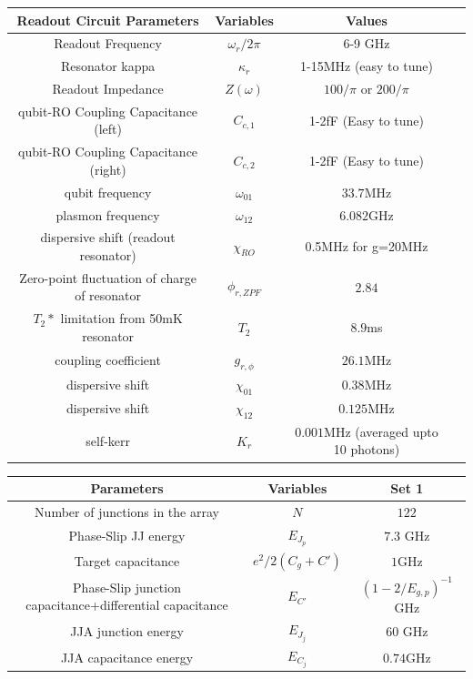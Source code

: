 \documentclass[prx,showpacs,notitlepage,twocolumn,superscriptaddress,nofootinbib,preprintnumbers,floatfix]{revtex4-2}
\begin{document}
\begin{table}[htb]
\begin{center}
\begin{tabular}{|c |c| c |c| }
 \hline
 \textbf{Readout Circuit Parameters} & \textbf{Variables} & \textbf{Values}\\ 
\hline
Readout Frequency&$\omega_r/2\pi$ &6-9 GHz\\
 \hline
 Resonator kappa&$\kappa_r$ &1-15MHz (easy to tune)\\
 \hline
Readout Impedance & $Z(\omega)$ & $100/\pi$ or $200/\pi$\\
 \hline
 qubit-RO Coupling Capacitance (left) &$C_{c,1}$ &1-2fF (Easy to tune)\\
 \hline
 qubit-RO Coupling Capacitance (right) &$C_{c,2}$ &1-2fF (Easy to tune)\\
 \hline
qubit frequency &$\omega_{01}$&$33.7$MHz\\ 
 \hline
plasmon frequency &$\omega_{12}$&$6.082$GHz\\ 
 \hline
dispersive shift (readout resonator) &$\chi_{RO}$&0.5MHz for g=20MHz\\ 
 \hline
Zero-point fluctuation of charge of resonator &$\phi_{r,ZPF}$&$2.84$\\
 \hline
$T_2*$ limitation from 50mK resonator &$T_2$&$8.9$ms\\
 \hline
coupling coefficient &$g_{r,\phi}$&$26.1$MHz\\
 \hline
dispersive shift &$\chi_{01}$&$0.38$MHz\\
 \hline
dispersive shift &$\chi_{12}$&$0.125$MHz\\
 \hline
self-kerr &$K_r$&$0.001$MHz (averaged upto 10 photons)\\
 \hline
 \end{tabular}
\end{center}
\begin{center}
\begin{tabular}{|c |c |c|}
 \hline
\textbf{Parameters}&\textbf{Variables} &Set 1\\ 
 \hline
Number of junctions in the array&$N$ &$122$\\ 
 \hline
Phase-Slip JJ energy&$E_{J_p}$ &$7.3$ GHz\\ 
\hline
Target capacitance&$e^2/2(C_g+C')$ &$1$GHz\\ 
\hline
Phase-Slip junction capacitance+differential capacitance &$E_{C'}$ &$(1-2/E_{g,p})^{-1}$GHz\\ 
\hline
JJA junction energy&$E_{J_j}$&60 GHz\\ 
\hline
JJA capacitance energy&$E_{C_j}$&$0.74$GHz\\ 

\end{tabular}
\end{center}
\end{table}
\end{document}
